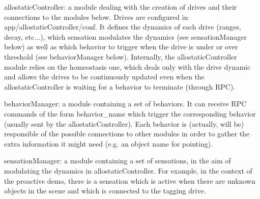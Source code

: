 \begin{DoxyItemize}
\item {\ttfamily allostatic\+Controller}\+: a module dealing with the creation of drives and their connections to the modules below. Drives are configured in {\ttfamily app/allostatic\+Controller/conf}. It defines the dynamics of each drive (ranges, decay, etc...), which sensation modulates the dynamics (see {\ttfamily sensation\+Manager} below) as well as which behavior to trigger when the drive is under or over threshold (see {\ttfamily behavior\+Manager} below). Internally, the {\ttfamily allostatic\+Controller} module relies on the {\ttfamily homeostasis} one, which deals only with the drive dynamic and allows the drives to be continuously updated even when the {\ttfamily allostatic\+Controller} is waiting for a behavior to terminate (through R\+PC).
\item {\ttfamily behavior\+Manager}\+: a module containing a set of behaviors. It can receive R\+PC commands of the form {\ttfamily behavior\+\_\+name} which trigger the corresponding behavior (usually sent by the {\ttfamily allostatic\+Controller}). Each behavior is (actually, will be) responsible of the possible connections to other modules in order to gather the extra information it might need (e.\+g. an object name for pointing).
\item {\ttfamily sensation\+Manager}\+: a module containing a set of sensations, in the aim of modulating the dynamics in {\ttfamily allostatic\+Controller}. For example, in the context of the proactive demo, there is a sensation which is active when there are unknown objects in the scene and which is connected to the {\ttfamily tagging} drive. 
\end{DoxyItemize}